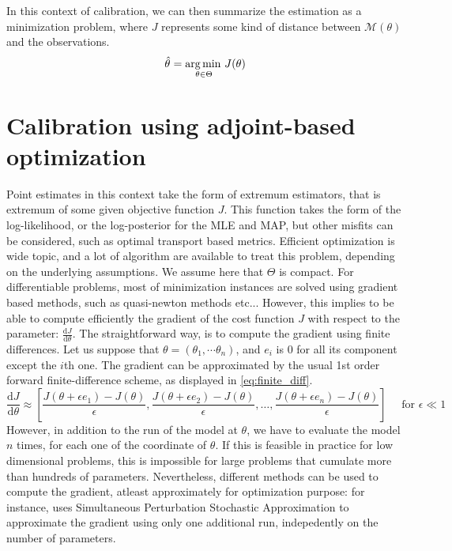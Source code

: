 \documentclass[../../Main_ManuscritThese.tex]{subfiles}
\begin{document}
In this context of calibration, we can then summarize the estimation as a minimization problem, where $J$ represents some kind of distance between $\mathcal{M}(\theta)$ and the observations.
\begin{equation}
  \hat{\theta}_{\mathrm{}} = \operatorname*{arg\,min \,}_{\theta\in \Theta} J(\theta)
\end{equation}

\section{Calibration using adjoint-based optimization}
\label{sec:calibration_adjoint_optimization}
Point estimates in this context take the form of extremum estimators, that is extremum of some given objective function $J$. This function takes the form of the log-likelihood, or the log-posterior for the MLE and MAP, but other misfits can be considered, such as optimal transport based metrics.
Efficient optimization is wide topic, and a lot of algorithm are available to treat this problem, depending on the underlying assumptions.
We assume here that $\Theta$ is compact. For differentiable problems, most of minimization instances are solved using gradient based methods, such as quasi-newton methods etc...
However, this implies to be able to compute efficiently the gradient of the cost function $J$ with respect to the parameter: $\frac{\mathrm{d}J}{\mathrm{d}\theta}$. The straightforward way, is to compute the gradient using finite differences. Let us suppose that $\theta = (\theta_1,\cdots \theta_n)$, and $e_i$ is 0 for all its component except the $i$th one. The gradient can be approximated by the usual 1st order forward finite-difference scheme, as displayed in \cref{eq:finite_diff}.
\begin{equation}
  \label{eq:finite_diff}
  \frac{\mathrm{d}J}{\mathrm{d}\theta} \approx \left[\frac{J(\theta + \epsilon e_1) - J(\theta)}{\epsilon}, \frac{J(\theta + \epsilon e_2) - J(\theta)}{ \epsilon},\dots, \frac{J(\theta + \epsilon e_n)- J(\theta)}{\epsilon} \right] \quad \text{ for } \epsilon \ll 1
\end{equation}
However, in addition to the run of the model at $\theta$, we have to evaluate the model $n$ times, for each one of the coordinate of $\theta$. If this is feasible in practice for low dimensional problems, this is impossible for large problems that cumulate more than hundreds of parameters. Nevertheless, different methods can be used to compute the gradient, atleast approximately for optimization purpose: for instance, \cite{boutet_estimation_2015} uses Simultaneous Perturbation Stochastic Approximation to approximate the gradient using only one additional run, indepedently on the number of parameters.
\end{document}
